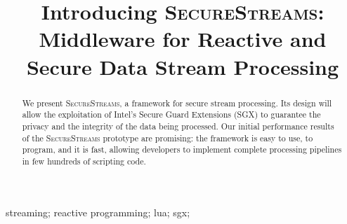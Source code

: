 \documentclass[10pt, conference]{IEEEtran}
\newcommand{\SYS}{\textsc{SecureStreams}\xspace}
\begin{document}
\title{Introducing \textsc{SecureStreams}: Middleware for Reactive and Secure Data Stream Processing}
\date{}


\author{

}

\maketitle


\begin{abstract}
We present \SYS, a framework for secure stream processing.
Its design will allow the exploitation of Intel's Secure Guard Extensions (SGX) to guarantee the privacy and the integrity of the data being processed. 
Our initial performance results of the \SYS prototype are promising: the framework is easy to use, to program, and it is fast, allowing developers to implement complete processing pipelines in few hundreds of scripting code.
\end{abstract}

\begin{IEEEkeywords}
streaming; reactive programming; lua; sgx;
\end{IEEEkeywords}


\end{document}
